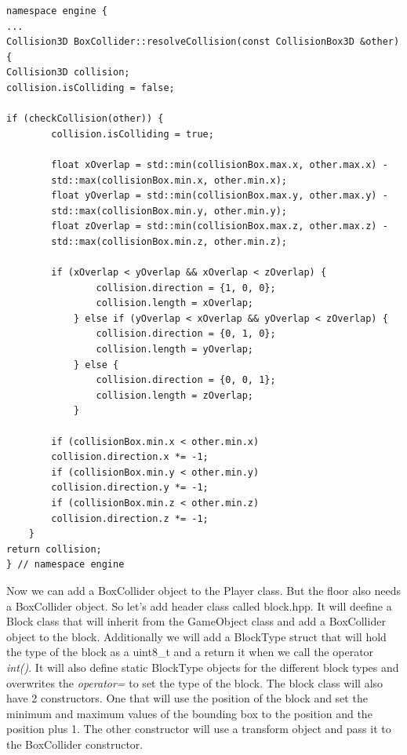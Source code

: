\documentclass[12pt]{report} \usepackage{preamble}
\begin{document}
\begin{lstlisting}[Language=C++]
namespace engine {
...
Collision3D BoxCollider::resolveCollision(const CollisionBox3D &other) {
Collision3D collision;
collision.isColliding = false;

if (checkCollision(other)) {
		collision.isColliding = true;

		float xOverlap = std::min(collisionBox.max.x, other.max.x) -
		std::max(collisionBox.min.x, other.min.x);
		float yOverlap = std::min(collisionBox.max.y, other.max.y) -
		std::max(collisionBox.min.y, other.min.y);
		float zOverlap = std::min(collisionBox.max.z, other.max.z) -
		std::max(collisionBox.min.z, other.min.z);

		if (xOverlap < yOverlap && xOverlap < zOverlap) {
				collision.direction = {1, 0, 0};
				collision.length = xOverlap;
			} else if (yOverlap < xOverlap && yOverlap < zOverlap) {
				collision.direction = {0, 1, 0};
				collision.length = yOverlap;
			} else {
				collision.direction = {0, 0, 1};
				collision.length = zOverlap;
			}

		if (collisionBox.min.x < other.min.x)
		collision.direction.x *= -1;
		if (collisionBox.min.y < other.min.y)
		collision.direction.y *= -1;
		if (collisionBox.min.z < other.min.z)
		collision.direction.z *= -1;
	}
return collision;
} // namespace engine
\end{lstlisting}

Now we can add a BoxCollider object to the Player class. But the floor also needs a BoxCollider object.
So let's add header class called block.hpp. It will deefine a Block class that will inherit from the GameObject class and add a BoxCollider object to the block.
Additionally we will add a BlockType struct that will hold the type of the block as a uint8_t and a return it when we call the operator \textit{int()}.
It will also define static BlockType objects for the different block types and overwrites the \textit{operator=} to set the type of the block.
The block class will also have 2 constructors. One that will use the position of the block and set the minimum and maximum values of the bounding box to the position and the position plus 1.
The other constructor will use a transform object and pass it to the BoxCollider constructor.
\end{document}
